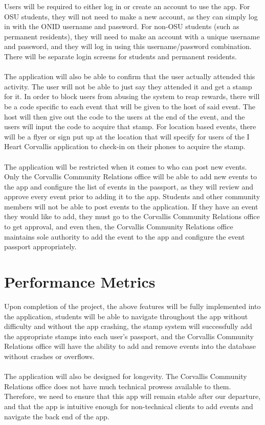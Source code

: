 \documentclass[draftclsnofoot, onecolumn, 10pt, compsoc]{IEEEtran}
\begin{document}
		Users will be required to either log in or create an account to use the app. For OSU students, they will not need to 
		make a new account, as they can simply log in with the ONID username and password. For non-OSU students (such 
		as permanent residents), they will need to make an account with a unique username and password, and they will log 
		in using this username/password combination. There will be separate login screens for students and permanent 
		residents. \\ \\			
		The application will also be able to confirm that the user actually attended this activity. The user will not be able to just 
		say they attended it and get a stamp for it. In order to block users from abusing the system to reap rewards, there will 
		be a code specific to each event that will be given to the host of said event. The host will then give out the code to the 
		users at the end of the event, and the users will input the code to acquire that stamp. For location based events, there 
		will be a flyer or sign put up at the location that will specify for users of the I Heart Corvallis application to check-in on 
		their phones to acquire the stamp. \\ \\			
		The application will be restricted when it comes to who can post new events. Only the Corvallis Community Relations 
		office will be able to add new events to the app and configure the list of events in the passport, as they will review and 
		approve every event prior to adding it to the app. Students and other community members will not be able to post 
		events to the application. If they have an event they would like to add, they must go to the Corvallis Community 
		Relations office to get approval, and even then, the Corvallis Community Relations office maintains sole authority to 
		add the event to the app and configure the event passport appropriately.
	
	\section{Performance Metrics}
		Upon completion of the project, the above features will be fully implemented into the application, students will be able 
		to navigate throughout the app without difficulty and without the app crashing, the stamp system will successfully add 
		the appropriate stamps into each user's passport, and the Corvallis Community Relations office will have the ability to 
		add and remove events into the database without crashes or overflows. \\ \\
		The application will also be designed for longevity. The Corvallis Community Relations office does not have much 
		technical prowess available to them. Therefore, we need to ensure that this app will remain stable after our departure, 
		and that the app is intuitive enough for non-technical clients to add events and navigate the back end of the app.
	
\end{document}
